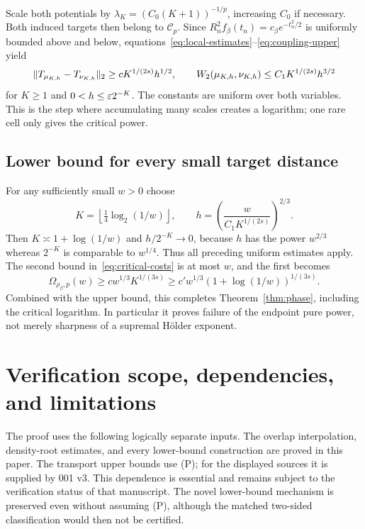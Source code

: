 \documentclass[11pt]{article}
\theoremstyle{remark}\newtheorem{remark}[theorem]{Remark}
\begin{document}
Scale both potentials by $\lambda_K=(C_0(K+1))^{-1/p}$, increasing $C_0$ if necessary. Both induced targets then belong to $\mathcal C_p$. Since
$R_n^2f_\beta(t_n)=c_\beta e^{-t_n^2/2}$ is uniformly bounded above and below, equations~\eqref{eq:local-estimates}--\eqref{eq:coupling-upper} yield
\begin{equation}\label{eq:critical-costs}
 \lVert T_{\mu_{K,h}}-T_{\nu_{K,h}}\rVert_2
 \ge c K^{1/(2s)}h^{1/2},\qquad
 W_2(\mu_{K,h},\nu_{K,h})\le C_1 K^{1/(2s)}h^{3/2}
\end{equation}
for $K\ge1$ and $0<h\le\varepsilon2^{-K}$. The constants are uniform over both variables. This is the step where accumulating many scales creates a logarithm; one rare cell only gives the critical power.

\subsection{Lower bound for every small target distance}
For any sufficiently small $w>0$ choose
\[
 K=\left\lfloor\tfrac14\log_2(1/w)\right\rfloor,\qquad
 h=\left(\frac{w}{C_1K^{1/(2s)}}\right)^{2/3}.
\]
Then $K\asymp1+\log(1/w)$ and $h/2^{-K}\to0$, because $h$ has the power $w^{2/3}$ whereas $2^{-K}$ is comparable to $w^{1/4}$. Thus all preceding uniform estimates apply. The second bound in~\eqref{eq:critical-costs} is at most $w$, and the first becomes
\[
 \Omega_{\rho_\beta,p}(w)
 \ge c w^{1/3}K^{1/(3s)}
 \ge c' w^{1/3}(1+\log(1/w))^{1/(3s)}.
\]
Combined with the upper bound, this completes Theorem~\ref{thm:phase}, including the critical logarithm. In particular it proves failure of the endpoint pure power, not merely sharpness of a supremal H\"older exponent.

\section{Verification scope, dependencies, and limitations}
The proof uses the following logically separate inputs. The overlap interpolation, density-root estimates, and every lower-bound construction are proved in this paper. The transport upper bounds use (P); for the displayed sources it is supplied by 001 v3. This dependence is essential and remains subject to the verification status of that manuscript. The novel lower-bound mechanism is preserved even without assuming (P), although the matched two-sided classification would then not be certified.
\end{document}
